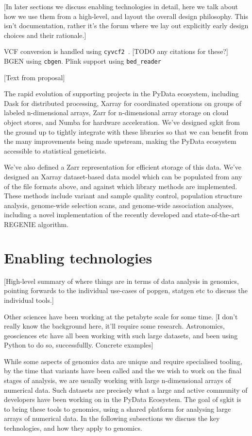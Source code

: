 \documentclass[a4paper,num-refs]{oup-contemporary}
\newcommand{\toolname}[1]{\texttt{#1}}
\begin{document}
[In later sections we discuss enabling technologies in detail,
here we talk about how we use them from a high-level, and layout
the overall design philosophy. This isn't documentation, rather
it's the forum where we lay out explicitly early design choices
and their rationale.]

VCF conversion is handled using
\toolname{cyvcf2}~\citep{pedersen2017cyvcf2}.
[TODO any citations for these?]
BGEN using \toolname{cbgen}.
Plink support using \toolname{bed\_reader}

[Text from proposal]

The rapid evolution of supporting projects in the PyData ecosystem, including Dask for
distributed processing, Xarray for coordinated operations on groups of labeled
n-dimensional arrays, Zarr for n-dimensional array storage on cloud object
stores, and Numba for hardware acceleration. We’ve designed sgkit from the
ground up to tightly integrate with these libraries so that we can benefit from
the many improvements being made upstream, making the PyData ecosystem
accessible to statistical geneticists.

We've also defined a Zarr representation for efficient storage of this data.
We’ve designed an Xarray dataset-based data model which can be populated from
any of the file formats above, and against which library methods are
implemented. These methods include variant and sample quality control,
population structure analysis, genome-wide selection scans, and genome-wide
association analyses, including a novel implementation of the recently
developed and state-of-the-art REGENIE algorithm.



\section{Enabling technologies}

[High-level summary of where things are in terms of data analysis
in genomics, pointing forwards to
the individual use-cases of popgen, statgen etc to discuss the
individual tools.]

Other sciences have been working at the petabyte scale for some time.
[I don't really know the background here, it'll require some research.
Astronomics, geosciences etc have all been working with such large
datasets, and been using Python to do so, successfullly. Concrete
examples]

While some aspects of genomics data are unique and require specialised
tooling, by the time that variants have been called and the we wish
to work on the final stages of analysis, we are usually
working with large n-dimensional arrays of numerical data. Such
datasets are precisely what a large and active community of
developers have been working on in the PyData Ecosystem. The goal
of sgkit is to bring these tools to genomics, using a
shared platform for analysing large arrays of numerical data. In the
following subsections we discuss the key technologies, and how
they apply to genomics.
\end{document}
